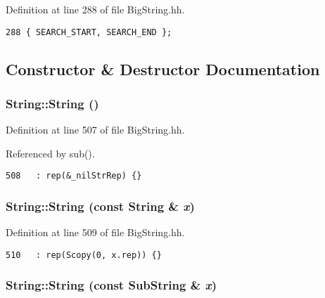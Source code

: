 Definition at line 288 of file Big\-String.hh.



\footnotesize\begin{verbatim}288 { SEARCH_START, SEARCH_END };
\end{verbatim}\normalsize 


\subsection{Constructor \& Destructor Documentation}
\subsubsection{\setlength{\rightskip}{0pt plus 5cm}String::String ()\hspace{0.3cm}{\tt  [inline]}}\label{classString_a0}




Definition at line 507 of file Big\-String.hh.

Referenced by sub().



\footnotesize\begin{verbatim}508   : rep(&_nilStrRep) {}
\end{verbatim}\normalsize 
{}
\subsubsection{\setlength{\rightskip}{0pt plus 5cm}String::String (const String \& {\em x})\hspace{0.3cm}{\tt  [inline]}}\label{classString_a1}




Definition at line 509 of file Big\-String.hh.



\footnotesize\begin{verbatim}510   : rep(Scopy(0, x.rep)) {}
\end{verbatim}\normalsize 
{}
\subsubsection{\setlength{\rightskip}{0pt plus 5cm}String::String (const {\bf Sub\-String} \& {\em x})\hspace{0.3cm}{\tt  [inline]}}\label{classString_a2}




